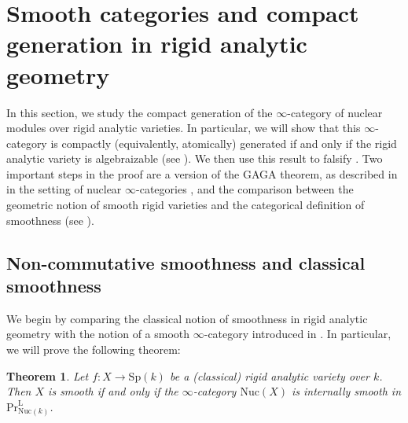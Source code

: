 \documentclass[oneside, hidelinks, 12pt, a4paper,reqno]{amsart}
\theoremstyle{plain}
\newtheorem{theorem}{Theorem}[section]
\theoremstyle{definition}
\theoremstyle{plain}
\newcommand{\rL}{\mathrm L}
\newcommand{\Sp}{\mathrm{Sp}}
\newcommand{\cat}{$\infty$-category }
\newcommand{\cates}{$\infty$-categories }
\newcommand{\LPr}{\mathrm{Pr}^\rL}
\newcommand{\Nuc}{\mathrm{Nuc}}
\begin{document}
\section{Smooth categories and compact generation in rigid analytic geometry}\label{section 4}

In this section, we study the compact generation of the \cat of nuclear modules over rigid analytic varieties. In particular, we will show that this \cat is compactly (equivalently, atomically) generated if and only if the rigid analytic variety is algebraizable (see ). We then use this result to falsify . Two important steps in the proof are a version of the GAGA theorem, as described in \cite{wang2026relativegagatheoremapplication} in the setting of nuclear \cates, and the comparison between the geometric notion of smooth rigid varieties and the categorical definition of smoothness (see ).

\subsection{Non-commutative smoothness and classical smoothness}

We begin by comparing the classical notion of smoothness in rigid analytic geometry with the notion of a smooth \cat introduced in . 
In particular, we will prove the following theorem:

\begin{theorem}\label{thm: main theorem smoothness}
    Let $f \colon X \to \Sp(k)$ be a (classical) rigid analytic variety over $k$. Then $X$ is smooth if and only if the \cat $\Nuc(X)$ is internally smooth in $\LPr_{\Nuc(k)}$.
\end{theorem}
\end{document}
